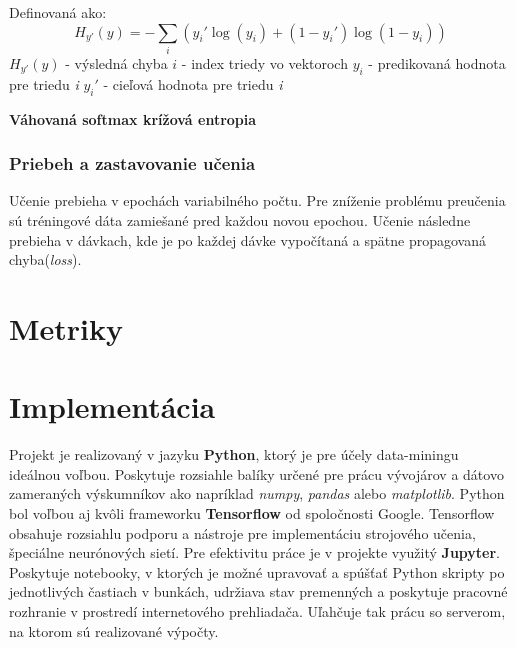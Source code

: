 Definovaná ako:
$$H_{y'}(y) = - \sum_{i} ({y_i' \log(y_i) + (1-y_i') \log (1-y_i)})$$
$H_{y'}(y)$ - výsledná chyba\newline
$i$ - index triedy vo vektoroch\newline
$y_i$ - predikovaná hodnota pre triedu \textit{i}\newline
$y_i'$ - cieľová hodnota pre triedu \textit{i}\newline

\textbf{Váhovaná softmax krížová entropia}\newline


\subsubsection*{Priebeh a zastavovanie učenia}

Učenie prebieha v epochách variabilného počtu. Pre zníženie problému preučenia sú tréningové dáta zamiešané pred každou novou epochou. Učenie následne prebieha v dávkach, kde je po každej dávke vypočítaná a spätne propagovaná chyba(\textit{loss}).





\section{Metriky}


\section{Implementácia}
\label{implementation}

Projekt je realizovaný v jazyku \textbf{Python}, ktorý je pre účely data-miningu ideálnou voľbou. Poskytuje rozsiahle balíky určené pre prácu vývojárov a dátovo zameraných výskumníkov ako napríklad \textit{numpy}, \textit{pandas} alebo \textit{matplotlib}. \newline
Python bol voľbou aj kvôli frameworku \textbf{Tensorflow} od spoločnosti Google. Tensorflow obsahuje rozsiahlu podporu a nástroje pre implementáciu strojového učenia, špeciálne neurónových sietí.\newline
Pre efektivitu práce je v projekte využitý \textbf{Jupyter}. Poskytuje notebooky, v ktorých je možné upravovať a spúšťať Python skripty po jednotlivých častiach v bunkách, udržiava stav premenných a poskytuje pracovné rozhranie v prostredí internetového prehliadača. Uľahčuje tak prácu so serverom, na ktorom sú realizované výpočty.